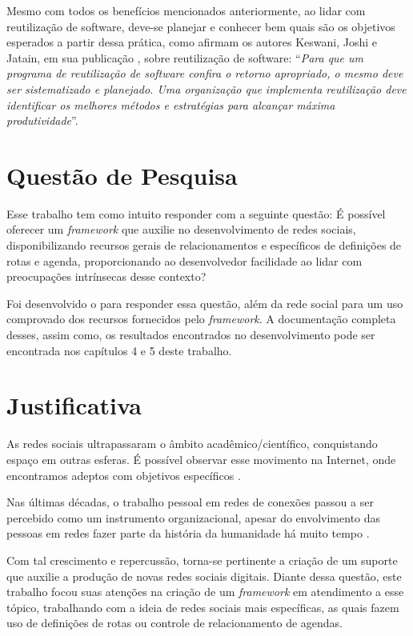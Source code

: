 Mesmo com todos os benefícios mencionados anteriormente, ao lidar com reutilização de software, deve-se planejar e conhecer bem quais são os objetivos esperados a partir dessa prática, como afirmam os autores Keswani, Joshi e Jatain, em sua publicação  \cite{Keswani:Joshi:Jatain:2014}, sobre reutilização de software: ``\textit{Para que um programa de reutilização de software confira o retorno apropriado, o mesmo deve ser sistematizado e planejado. Uma organização que implementa reutilização deve identificar os melhores métodos e estratégias para alcançar máxima produtividade}''.

\section*{Questão de Pesquisa}

Esse trabalho tem como intuito responder com a seguinte questão: É possível oferecer um \textit{framework} que auxilie no desenvolvimento de redes sociais, disponibilizando recursos gerais de relacionamentos e específicos de definições de rotas e agenda, proporcionando ao desenvolvedor facilidade ao lidar com preocupações intrínsecas desse contexto?

Foi desenvolvido o  para responder essa questão, além da rede social  para um uso comprovado dos recursos fornecidos pelo \textit{framework}. A documentação completa desses, assim como, os resultados encontrados no desenvolvimento pode ser encontrada nos capítulos 4 e 5 deste trabalho.

\section*{Justificativa}

As redes sociais ultrapassaram o âmbito acadêmico/científico, conquistando espaço em outras esferas. É possível observar esse movimento na Internet, onde encontramos adeptos com objetivos específicos \cite{Tomae:Alcara:Chiara:2005}.

Nas últimas décadas, o trabalho pessoal em redes de conexões passou a ser percebido como um instrumento organizacional, apesar do envolvimento das pessoas em redes fazer parte da história da humanidade há muito tempo \cite{Tomae:Alcara:Chiara:2005}.

Com tal crescimento e repercussão, torna-se pertinente a criação de um suporte que auxilie a produção de novas redes sociais digitais. Diante dessa questão, este trabalho focou suas atenções na criação de um \textit{framework} em atendimento a esse tópico, trabalhando com a ideia de redes sociais mais específicas, as quais fazem uso de definições de rotas ou controle de relacionamento de agendas.

